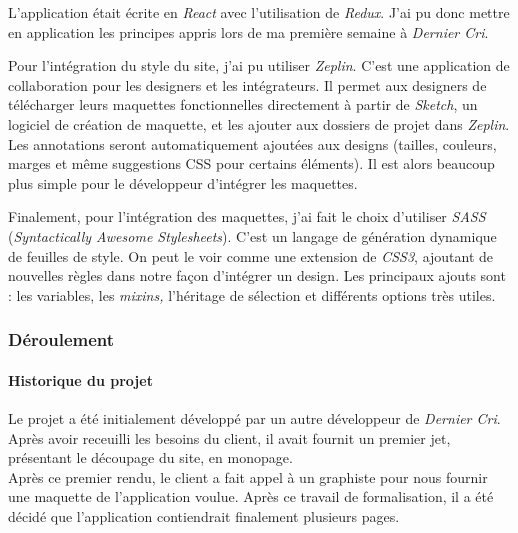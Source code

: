 \bigskip

L'application était écrite en \emph{React} avec l'utilisation de
\emph{Redux}. J'ai pu donc mettre en application les principes appris
lors de ma première semaine à \emph{Dernier Cri}.

\bigskip

Pour l'intégration du style du site, j'ai pu utiliser \emph{Zeplin}.
C'est une application de collaboration pour les designers et les
intégrateurs. Il permet aux designers de télécharger leurs maquettes
fonctionnelles directement à partir de \emph{Sketch}, un logiciel de
création de maquette, et les ajouter aux dossiers de projet dans
\emph{Zeplin}. Les annotations seront automatiquement ajoutées aux
designs (tailles, couleurs, marges et même suggestions CSS pour certains
éléments). Il est alors beaucoup plus simple pour le développeur
d'intégrer les maquettes.

\bigskip

Finalement, pour l'intégration des maquettes, j'ai fait le choix
d'utiliser \emph{SASS} (\emph{Syntactically Awesome Stylesheets}). C'est
un langage de génération dynamique de feuilles de style. On peut le voir
comme une extension de \emph{CSS3}, ajoutant de nouvelles règles dans
notre façon d'intégrer un design. Les principaux ajouts sont : les
variables, les \emph{mixins,} l'héritage de sélection et différents
options très utiles.

\bigskip

\subsubsection{Déroulement}\label{duxe9roulement}

\bigskip

\paragraph{Historique du projet}\label{historique-du-projet}

\bigskip

Le projet a été initialement développé par un autre développeur de
\emph{Dernier Cri}. Après avoir receuilli les besoins du client, il
avait fournit un premier jet, présentant le découpage du site, en
monopage.\\
Après ce premier rendu, le client a fait appel à un graphiste pour nous
fournir une maquette de l'application voulue. Après ce travail de
formalisation, il a été décidé que l'application contiendrait finalement
plusieurs pages.

